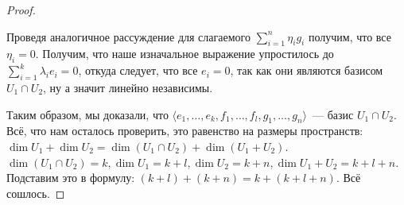 \begin{proof}
\begin{enumerate}
            Проведя аналогичное рассуждение для слагаемого $\sum\limits_{i=1}^{n}\eta_ig_i$ получим, что все
            $\eta_i = 0$. Получим, что наше изначальное выражение упростилось до 
            $\sum\limits_{i=1}^{k}\lambda_ie_i = 0$, откуда следует, что все $e_i = 0$, так как они
            являются базисом $U_1\cap U_2$, ну а значит линейно независимы.
    \end{enumerate}
    Таким образом, мы доказали, что $\langle e_1,\dots,e_k,f_1,\dots,f_l,g_1,\dots,g_n\rangle$~---
    базис $U_1\cap U_2$. Всё, что нам осталось проверить, это равенство на размеры пространств:
    $\dim U_1 + \dim U_2 = \dim(U_1 \cap U_2) + \dim(U_1 + U_2)$.
    $\dim (U_1\cap U_2) = k, \dim U_1 = k + l, \dim U_2 = k + n, \dim U_1 + U_2 = k + l + n$.
    Подставим это в формулу: $(k + l) + (k + n) = k + (k + l + n)$. Всё сошлось.
\end{proof}
